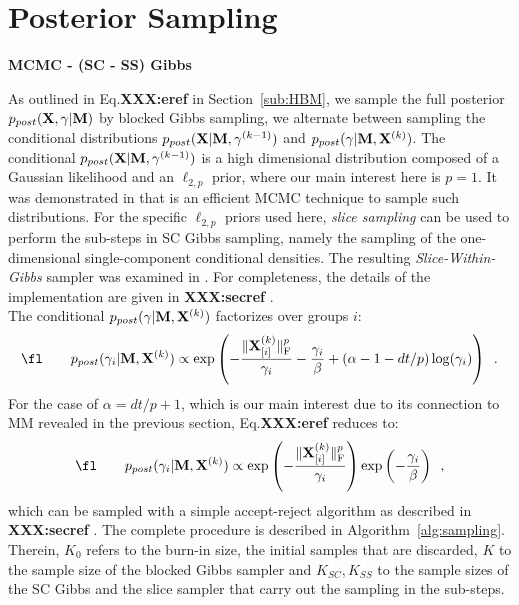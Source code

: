 \section{Posterior Sampling}
\textbf{MCMC - (SC - SS) Gibbs}

\label{sub:sampling}

As outlined in Eq.\textbf{XXX:eref}%
 in Section~\ref{sub:HBM}, we sample the full posterior $p_{post}(\mathbf{X},\gamma|\mathbf{M})$ by blocked Gibbs sampling, \ie we alternate between sampling the conditional distributions $p_{post}(\mathbf{X}|\mathbf{M},\gamma^{(k-1)})$ and $p_{post}(\gamma|\mathbf{M},\mathbf{X}^{(k)})$. The conditional $p_{post}(\mathbf{X}|\mathbf{M},\gamma^{(k-1)})$ is a high dimensional distribution composed of a Gaussian likelihood and an $\ell_{2,p}$ prior, where our main interest here is $p = 1$. It was demonstrated in \cite{Lu12} that  is an efficient MCMC technique to sample such distributions. For the specific $\ell_{2,p}$ priors used here, \emph{slice sampling} can be used to perform the sub-steps in SC Gibbs sampling, namely the sampling of the one-dimensional single-component conditional densities. The resulting \emph{Slice-Within-Gibbs} sampler was examined in \cite{Lu16}. For completeness, the details of the implementation are given in \textbf{XXX:secref}%
 .\\
The conditional $p_{post}(\gamma|\mathbf{M},\mathbf{X}^{(k)})$ factorizes over groups $i$:
\begin{equation}
\fl \qquad p_{post}(\gamma_i|\bfM,\bfX^{(k)}) \propto \exp \left( -\frac{\fronorm{\bfX^{(k)}_{[i]}}^p}{\gamma_i} - \frac{\gamma_i}{\beta} + (\alpha - 1 - d t/p) \log(\gamma_i) \right) \enspace. \label{eq:conPostGammai}
\end{equation}
For the case of $\alpha = d t/p + 1$, which is our main interest due to its connection to MM revealed in the previous section, Eq.\textbf{XXX:eref}%
 reduces to:
\begin{equation}
\fl \qquad p_{post}(\gamma_i |\bfM, \bfX^{(k)}) \propto \exp \left(- \frac{\fronorm{\bfX^{(k)}_{[i]}}^p}{\gamma_i} \right) \exp \left(- \frac{\gamma_i}{\beta} \right) \enspace, \label{eq:conPostGammaiRed}
\end{equation}
which can be sampled with a simple accept-reject algorithm as described in \textbf{XXX:secref}%
. The complete procedure is described in Algorithm~\ref{alg:sampling}. Therein, $K_0$ refers to the burn-in size, \ie the initial samples that are discarded, $K$ to the sample size of the blocked Gibbs sampler and $K_{SC}, K_{SS}$ to the sample sizes of the SC Gibbs and the slice sampler that carry out the sampling in the sub-steps.

